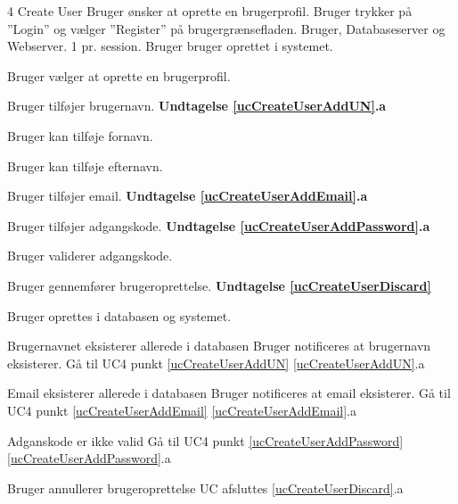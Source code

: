 
\uchead
	{4}
	{Create User}
	{Bruger ønsker at oprette en brugerprofil.}
	{Bruger trykker på ''Login'' og vælger ''Register'' på brugergrænsefladen.}
	{Bruger, Databaseserver og Webserver.}
	{}
	{1 pr. session.}
	{Bruger bruger oprettet i systemet.}

\item \label{ucCreateUserOptions} Bruger vælger at oprette en brugerprofil. \newline

\item \label{ucCreateUserAddUN} Bruger tilføjer brugernavn.
\textbf{Undtagelse \ref{ucCreateUserAddUN}.a}

\item Bruger kan tilføje fornavn.
\item Bruger kan tilføje efternavn.

\item \label{ucCreateUserAddEmail} Bruger tilføjer email.
\textbf{Undtagelse \ref{ucCreateUserAddEmail}.a}

\item \label{ucCreateUserAddPassword} Bruger tilføjer adgangskode.
\textbf{Undtagelse \ref{ucCreateUserAddPassword}.a}

\item Bruger validerer adgangskode.

\item \label{ucCreateUserDiscard} Bruger gennemfører brugeroprettelse.
\textbf{Undtagelse \ref{ucCreateUserDiscard}}

\item \label{ucCreateUserCreated} Bruger oprettes i databasen og systemet.

\ucdescriptionend


	
	
\ucextension
	{Brugernavnet eksisterer allerede i databasen}
	{Bruger notificeres at brugernavn eksisterer.\newline
	Gå til UC4 punkt \ref{ucCreateUserAddUN}}
	{\ref{ucCreateUserAddUN}.a}
	


\ucextension
	{Email eksisterer allerede i databasen}
	{Bruger notificeres at email eksisterer.\newline
	Gå til UC4 punkt \ref{ucCreateUserAddEmail}}
	{\ref{ucCreateUserAddEmail}.a}



\ucextension
	{Adganskode er ikke valid}
	{Gå til UC4 punkt \ref{ucCreateUserAddPassword}}
	{\ref{ucCreateUserAddPassword}.a}



\ucextension
	{Bruger annullerer brugeroprettelse}
	{UC afsluttes}
	{\ref{ucCreateUserDiscard}.a}
		
